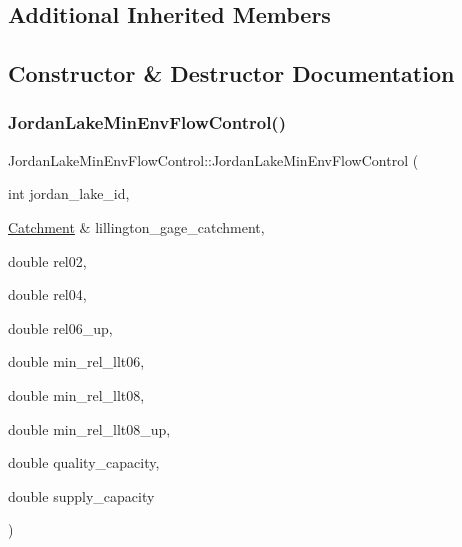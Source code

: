 \subsection*{Additional Inherited Members}


\subsection{Constructor \& Destructor Documentation}
\mbox{\label{classJordanLakeMinEnvFlowControl_ac8e2b846b66115c2db3bc4ea3ed44297}} 
\subsubsection{\texorpdfstring{Jordan\+Lake\+Min\+Env\+Flow\+Control()}{JordanLakeMinEnvFlowControl()}\hspace{0.1cm}{\footnotesize\ttfamily [1/2]}}
{\footnotesize\ttfamily Jordan\+Lake\+Min\+Env\+Flow\+Control\+::\+Jordan\+Lake\+Min\+Env\+Flow\+Control (\begin{DoxyParamCaption}\item[{int}]{jordan\+\_\+lake\+\_\+id,  }\item[{\mbox{\hyperlink{classCatchment}{Catchment}} \&}]{lillington\+\_\+gage\+\_\+catchment,  }\item[{double}]{rel02,  }\item[{double}]{rel04,  }\item[{double}]{rel06\+\_\+up,  }\item[{double}]{min\+\_\+rel\+\_\+llt06,  }\item[{double}]{min\+\_\+rel\+\_\+llt08,  }\item[{double}]{min\+\_\+rel\+\_\+llt08\+\_\+up,  }\item[{double}]{quality\+\_\+capacity,  }\item[{double}]{supply\+\_\+capacity }\end{DoxyParamCaption})}

